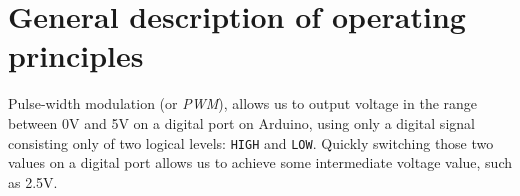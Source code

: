\documentclass[../sparc.tex]{subfiles}
\begin{document}
\section{General description of operating principles}

Pulse-width modulation (or \emph{\gls{PWM}}), allows us to output voltage in the
range between 0V and 5V on a digital port on Arduino, using only a digital
signal consisting only of two logical levels: \texttt{HIGH} and \texttt{LOW}.
Quickly switching those two values on a digital port allows us to achieve some
intermediate voltage value, such as 2.5V.
\end{document}
